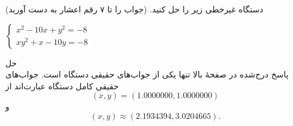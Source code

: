 دستگاه غیرخطی زیر را حل کنید. (جواب را تا ۷ رقم اعشار به دست آورید)

\begin{center}
$
    \begin{cases}
    x^2 - 10x + y^2 = -8 \\
    xy^2 + x - 10y = -8
    \end{cases}
$
\end{center}

{\color{blue}حل}
\\


\begingroup\color{blue}
پاسخ درج‌شده در صفحهٔ بالا تنها یکی از جواب‌های حقیقی دستگاه است. جواب‌های حقیقی کامل دستگاه عبارت‌اند از
\[
 (x,y)=(1.0000000,1.0000000)
\]
و
\[
 (x,y)\approx(2.1934394,3.0204665).
\]
\endgroup
